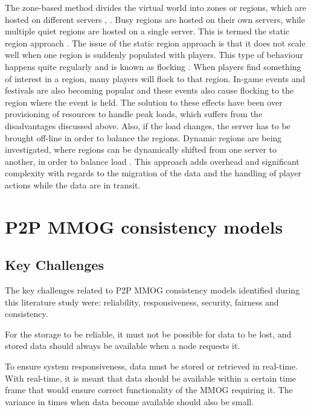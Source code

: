 \documentclass[journal,oneside,a4paper,onecolumn]{IEEEtran}
\begin{document}
The zone-based method divides the virtual world into zones or regions, which are hosted on different servers \cite{zone_based_stat}, \cite{zone_based_dyn}. Busy regions are hosted on their own servers, while multiple quiet regions are hosted on a single server. This is termed the static region approach \cite{zone_based_stat}. The issue of the static region approach is that it does not scale well when one region is suddenly populated with players. This type of behaviour happens quite regularly and is known as flocking \cite{flocking}. When players find something of interest in a region, many players will flock to that region. In-game events and festivals are also becoming popular and these events also cause flocking to the region where the event is held. The solution to these effects have been over provisioning of resources to handle peak loads, which suffers from the disadvantages discussed above. Also, if the load changes, the server has to be brought off-line in order to balance the regions. Dynamic regions are being investigated, where regions can be dynamically shifted from one server to another, in order to balance load \cite{zone_based_dyn}. This approach adds overhead and significant complexity with regards to the migration of the data and the handling of player actions while the data are in transit.

\section{P2P MMOG consistency models}
\label{p2p_mmog_cm}

\subsection{Key Challenges}
\label{key_challenges_cm}

The key challenges related to P2P MMOG consistency models identified during this literature study were: reliability, responsiveness, security, fairness and consistency.

For the storage to be reliable, it must not be possible for data to be lost, and stored data should always be available when a node requests it.

To ensure system responsiveness, data must be stored or retrieved in real-time. With real-time, it is meant that data should be available within a certain time frame that would ensure correct functionality of the MMOG requiring it. The variance in times when data become available should also be small.
\end{document}
